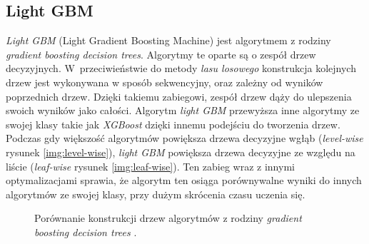 \documentclass[a4paper, twoside, 11pt, openright]{article}
\begin{document}
\subsection{Light GBM}

\textit{Light GBM} (Light Gradient Boosting Machine)\cite{lgbm} jest algorytmem z rodziny \textit{gradient boosting decision trees}. Algorytmy te oparte są o zespół drzew decyzyjnych. W~przeciwieństwie do metody \textit{lasu losowego} konstrukcja kolejnych drzew jest wykonywana w sposób sekwencyjny, oraz zależny od wyników poprzednich drzew. Dzięki takiemu zabiegowi, zespół drzew dąży do ulepszenia swoich wyników jako całości. Algorytm \textit{light GBM} przewyższa inne algorytmy ze swojej klasy takie jak \textit{XGBoost} dzięki innemu podejściu do tworzenia drzew. Podczas gdy większość algorytmów powiększa drzewa decyzyjne wgłąb (\textit{level-wise}  rysunek \ref{img:level-wise}), \textit{light GBM} powiększa drzewa decyzyjne ze względu na liście (\textit{leaf-wise} rysunek \ref{img:leaf-wise}). Ten zabieg wraz z innymi optymalizacjami sprawia, że algorytm ten osiąga porównywalne wyniki do innych algorytmów ze swojej klasy, przy dużym skrócenia czasu uczenia się. 


\begin{figure}[H]%
\centering
{}%
\qquad
{}%
\caption{Porównanie konstrukcji drzew algorytmów z rodziny \textit{gradient boosting decision trees} \cite{dectreescompare}.}
\label{img:level-leaf-wise}
\end{figure}
\end{document}
